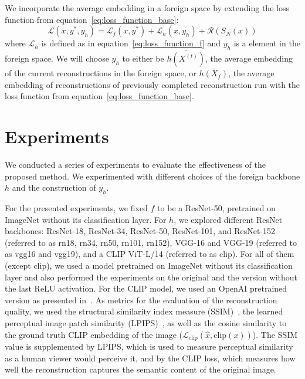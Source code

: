 \documentclass[10pt,twocolumn]{article}
\begin{document}
We incorporate the average embedding in a foreign space by extending the loss function from equation~\ref{eq:loss_function_base}:
\begin{equation}\label{eq:loss_function}
\mathcal{L}(x, y^*, y_h) = \mathcal{L}_{f}(x, y^*) + \mathcal{L}_{h}(x, y_h) + \mathcal{R}(S_N(x))
\end{equation}
where $\mathcal{L}_{h}$ is defined as in equation~\ref{eq:loss_function_f} and $y_h$ is a element in the foreign space.
We will choose $y_h$ to either be $\overline{h(X^{(t)})}$, the average embedding of the current reconstructions in the foreign space, or $\overline{h(X_f)}$, the average embedding of reconstructions of previously completed reconstruction run with the loss function from equation~\ref{eq:loss_function_base}.

\section{Experiments}
We conducted a series of experiments to evaluate the effectiveness of the proposed method.
We experimented with different choices of the foreign backbone $h$ and the construction of $y_h$.

For the presented experiments, we fixed $f$ to be a ResNet-50, pretrained on ImageNet without its classification layer.
For $h$, we explored different ResNet backbones: ResNet-18, ResNet-34, ResNet-50, ResNet-101, and ResNet-152 (referred to as rn18, rn34, rn50, rn101, rn152), VGG-16 and VGG-19 (referred to as vgg16 and vgg19), and a CLIP ViT-L/14 (referred to as clip).
For all of them (except clip), we used a model pretrained on ImageNet without its classification layer and also performed the experiments on the original and the version without the last ReLU activation.
For the CLIP model, we used an OpenAI pretrained version as presented in~\cite{radfordLearningTransferableVisual2021}.
As metrics for the evaluation of the reconstruction quality, we used the structural similarity index measure (SSIM)~\cite{zhouwangImageQualityAssessment2004}, the learned perceptual image patch similarity (LPIPS)~\cite{zhangUnreasonableEffectivenessDeep2018}, as well as the cosine similarity to the ground truth CLIP embedding of the image ($\mathcal{L}_{\text{clip}}(\hat x, \text{clip}(x))$).
The SSIM value is supplemented by LPIPS, which is used to measure perceptual similarity as a human viewer would perceive it, and by the CLIP loss, which measures how well the reconstruction captures the semantic content of the original image.
\end{document}
